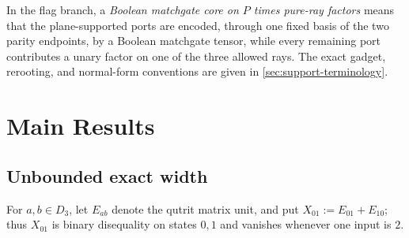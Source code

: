 \documentclass[11pt]{article}
\theoremstyle{definition}
\theoremstyle{remark}
\begin{document}
In the flag branch, a \emph{Boolean matchgate core on $P$ times pure-ray
factors} means that the plane-supported ports are encoded, through one
fixed basis of the two parity endpoints, by a Boolean matchgate tensor,
while every remaining port contributes a unary factor on one of the three
allowed rays.  The exact gadget, rerooting, and normal-form conventions are
given in \cref{sec:support-terminology}.

\section{Main Results}
\label{sec:main-results}

\subsection{Unbounded exact width}

For $a,b\in D_3$, let $E_{ab}$ denote the qutrit matrix unit, and put
$X_{01}:=E_{01}+E_{10}$; thus $X_{01}$ is binary disequality on states
$0,1$ and vanishes whenever one input is $2$.
\end{document}
